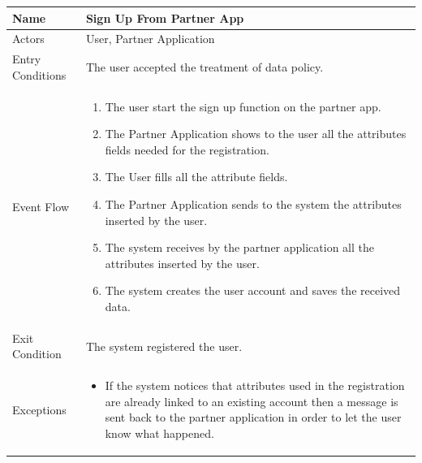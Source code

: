 \begin{enumerate}
\FloatBarrier
\begin{table}[h]
\begin{tabular}{|l|p{}|}
\hline
Name             & Sign Up From Partner App\\ \hline
Actors           & User, Partner Application  \\ \hline
Entry Conditions & The user accepted the treatment of data policy.  \\ \hline
Event Flow       & \begin{enumerate}
			\item The user start the sign up function on the partner app.
			\item The Partner Application shows to the user all the attributes fields needed for the registration.
            \item The User fills all the attribute fields.
            \item The Partner Application sends to the system the attributes inserted by the user.
            \item The system receives by the partner application all the attributes inserted by the user.
            \item The system creates the user account and saves the received data.
        \end{enumerate}\\ \hline
Exit Condition   & The system registered the user.\\ \hline
Exceptions       & \begin{itemize}
\item If the system notices that attributes used in the registration are already linked to an existing account then a message is sent back to the partner application in order to let the user know what happened.
\end{itemize}\\ \hline
\end{tabular}
\end{table}
\FloatBarrier


\end{enumerate}
